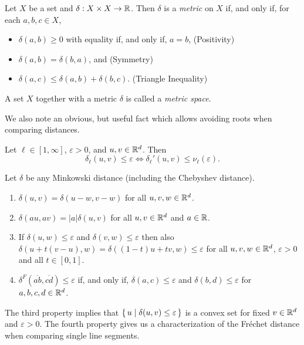 \begin{definition}\label{def:metric}
  Let \(X\) be a set and \(\delta:X\times X \to \mathbb{R}\). Then \(\delta\) is a \emph{metric} on \(X\) if, and only if, for each \(a, b, c \in X\), 
  \begin{itemize}
    \item \(\delta(a, b) \geq 0\) with equality if, and only if, \(a = b\), \hfill (Positivity)
    \item \(\delta(a, b) = \delta(b, a)\), and \hfill (Symmetry)
    \item \(\delta(a, c) \leq \delta(a, b) + \delta(b, c)\). \hfill (Triangle Inequality)
  \end{itemize}

  A set \(X\) together with a metric \(\delta\) is called a \emph{metric space}.
\end{definition}

We also note an obvious, but useful fact which allows avoiding roots when comparing distances. 
\begin{observation}\label{obs:unnormalize}
  Let \(\ell \in [1, \infty]\), \(\varepsilon > 0\), and \(u, v \in \mathbb{R}^d\). Then 
    \[\delta_\ell(u, v) \leq \varepsilon \iff \delta_\ell'(u, v) \leq \nu_\ell(\varepsilon).\]
\end{observation}


\begin{lemma}\label{lem:distance_properties}
  Let \(\delta\) be any Minkowski distance (including the Chebyshev distance).
  \begin{enumerate}
    \item \(\delta(u, v) = \delta(u - w, v - w)\) for all \(u, v, w\in \mathbb{R}^d\).
    \item \(\delta(a u, a v) = |a| \delta(u, v)\) for all \(u, v\in \mathbb{R}^d\)  and \(a \in \mathbb{R}\).
    \item If \(\delta(u, w) \leq \varepsilon\) and \(\delta(v, w) \leq \varepsilon\) then also \(\delta(u + t(v-u), w) = \delta((1-t)u + tv, w) \leq \varepsilon\) for all \(u, v, w\in \mathbb{R}^d\), \(\varepsilon > 0\) and all \(t \in [0, 1]\).
    \item \(\delta^F(\overline{ab}, \overline{cd}) \leq \varepsilon\) if, and only if, \(\delta(a, c) \leq \varepsilon\) and \(\delta(b, d) \leq \varepsilon\) for \(a,b,c,d \in \mathbb{R}^d\).
  \end{enumerate}
\end{lemma}

The third property implies that \(\set{u \mid \delta(u, v) \leq \varepsilon }\) is a convex set for fixed \(v \in \mathbb{R}^d\) and \(\varepsilon >0 \).
The fourth property gives us a characterization of the Fréchet distance when comparing single line segments. 

